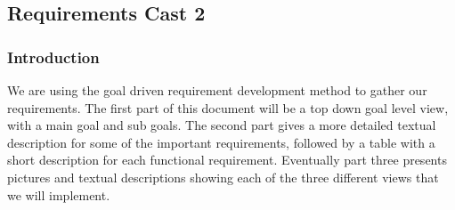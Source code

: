 \documentclass[../document]{subfiles}
\begin{document}
\subsection{Requirements Cast 2}
\label{requirements_cast_2}
\subsubsection{Introduction}
We are using the goal driven requirement development method to gather our requirements. The first part of this document will be a top down goal level view, with a main goal and sub goals. The second part gives a more detailed textual description for some of the important requirements, followed by a table with a short description for each functional requirement. Eventually part three presents pictures and textual descriptions showing each of the three different views that we will implement.
\end{document}
